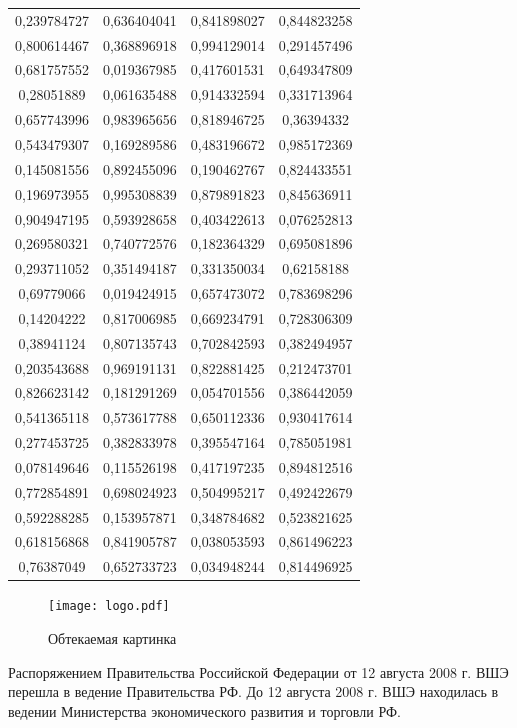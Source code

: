 \documentclass[a4paper,12pt]{article}
\begin{document}
\begin{longtable}{|c|c|c|c|}
  0,239784727 & 0,636404041 & 0,841898027 & 0,844823258 \\
  0,800614467 & 0,368896918 & 0,994129014 & 0,291457496 \\
  0,681757552 & 0,019367985 & 0,417601531 & 0,649347809 \\
  0,28051889 & 0,061635488 & 0,914332594 & 0,331713964 \\
  0,657743996 & 0,983965656 & 0,818946725 & 0,36394332 \\
  0,543479307 & 0,169289586 & 0,483196672 & 0,985172369 \\
  0,145081556 & 0,892455096 & 0,190462767 & 0,824433551 \\
  0,196973955 & 0,995308839 & 0,879891823 & 0,845636911 \\
  0,904947195 & 0,593928658 & 0,403422613 & 0,076252813 \\
  0,269580321 & 0,740772576 & 0,182364329 & 0,695081896 \\
  0,293711052 & 0,351494187 & 0,331350034 & 0,62158188 \\
  0,69779066 & 0,019424915 & 0,657473072 & 0,783698296 \\
  0,14204222 & 0,817006985 & 0,669234791 & 0,728306309 \\
  0,38941124 & 0,807135743 & 0,702842593 & 0,382494957 \\
  0,203543688 & 0,969191131 & 0,822881425 & 0,212473701 \\
  0,826623142 & 0,181291269 & 0,054701556 & 0,386442059 \\
  0,541365118 & 0,573617788 & 0,650112336 & 0,930417614 \\
  0,277453725 & 0,382833978 & 0,395547164 & 0,785051981 \\
  0,078149646 & 0,115526198 & 0,417197235 & 0,894812516 \\
  0,772854891 & 0,698024923 & 0,504995217 & 0,492422679 \\
  0,592288285 & 0,153957871 & 0,348784682 & 0,523821625 \\
  0,618156868 & 0,841905787 & 0,038053593 & 0,861496223 \\
  0,76387049 & 0,652733723 & 0,034948244 & 0,814496925 \\
\end{longtable}


\begin{figure}
  \texttt{[image: logo.pdf]}
  \caption{Обтекаемая картинка}
\end{figure}
Распоряжением Правительства Российской Федерации от 12 августа 2008 г. ВШЭ перешла в ведение Правительства РФ. До 12 августа 2008 г. ВШЭ находилась в ведении Министерства экономического развития и торговли РФ.
\end{document}
